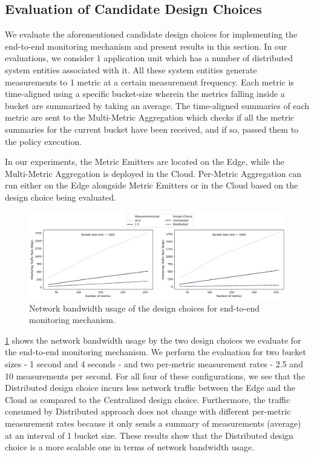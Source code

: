 \subsection{Evaluation of Candidate Design Choices}
We evaluate the aforementioned candidate design choices for implementing the end-to-end monitoring mechanism and present results in this section. In our evaluations, we consider 1 application unit which has a number of distributed system entities associated with it. All these system entities generate measurements to 1 metric at a certain measurement frequency. Each metric is time-aligned using a specific bucket-size wherein the metrics falling inside a bucket are summarized by taking an average. The time-aligned summaries of each metric are sent to the Multi-Metric Aggregation which checks if all the metric summaries for the current bucket have been received, and if so, passed them to the policy execution. 
\par In our experiments, the Metric Emitters are located on the Edge, while the Multi-Metric Aggregation is deployed in the Cloud. Per-Metric Aggregation can run either on the Edge alongside Metric Emitters or in the Cloud based on the design choice being evaluated. 

\begin{figure}
\centering
\includegraphics[width=\linewidth]{figures/design_space/monitoring/nw_usage.png}
\caption{Network bandwidth usage of the design choices for end-to-end monitoring mechanism.}
\label{fig:monitoring_nw_usage}
\end{figure}
\cref{fig:monitoring_nw_usage} shows the network bandwidth usage by the two design choices we evaluate for the end-to-end monitoring mechanism. We perform the evaluation for two bucket sizes - 1 second and 4 seconds - and two per-metric measurement rates - 2.5 and 10 measurements per second. For all four of these configurations, we see that the Distributed design choice incurs less network traffic between the Edge and the Cloud as compared to the Centralized design choice. Furthermore, the traffic consumed by Distributed approach does not change with different per-metric measurement rates because it only sends a summary of measurements (average) at an interval of 1 bucket size. These results show that the Distributed design choice is a more scalable one in terms of network bandwidth usage.

